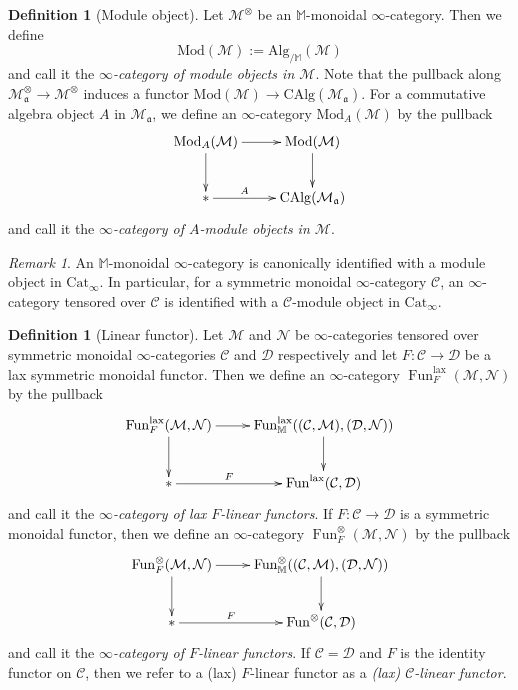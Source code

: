 \documentclass{amsart}
\theoremstyle{plain}
\theoremstyle{definition}
\newtheorem{definition}[theorem]{Definition}
\theoremstyle{remark}
\newtheorem{remark}[theorem]{Remark}
\numberwithin{equation}{theorem}
\newcommand{\mcal}[1]{\mathcal{#1}}
\newcommand{\mbb}[1]{\mathbb{#1}}
\newcommand{\mfk}[1]{\mathfrak{#1}}
\newcommand{\Alg}{\mathrm{Alg}}
\newcommand{\CAlg}{\mathrm{CAlg}}
\newcommand{\Cat}{\mathrm{Cat}}
\newcommand{\Mod}{\mathrm{Mod}}
\newcommand{\lax}{\mathrm{lax}}
\newcommand{\Fun}{\operatorname{Fun}}
\begin{document}
\begin{definition}[Module object]\label{def:Mod3}
Let $\mcal{M}^\otimes$ be an $\mbb{M}$-monoidal $\infty$-category.
Then we define
\[
	\Mod(\mcal{M}) := \Alg_{/\mbb{M}}(\mcal{M})
\]
and call it the \textit{$\infty$-category of module objects in $\mcal{M}$}.
Note that the pullback along $\mcal{M}^\otimes_\mfk{a}\to\mcal{M}^\otimes$ induces a functor $\Mod(\mcal{M})\to\CAlg(\mcal{M}_\mfk{a})$.
For a commutative algebra object $A$ in $\mcal{M}_\mfk{a}$, we define an $\infty$-category $\Mod_A(\mcal{M})$ by the pullback
\[
\xymatrix{
	\Mod_A(\mcal{M}) \ar[r] \ar[d] & \Mod(\mcal{M}) \ar[d] \\
	{*} \ar[r]^-A & \CAlg(\mcal{M}_\mfk{a})
}
\]
and call it the \textit{$\infty$-category of $A$-module objects in $\mcal{M}$}.
\end{definition}

\begin{remark}
An $\mbb{M}$-monoidal $\infty$-category is canonically identified with a module object in $\Cat_\infty$.
In particular, for a symmetric monoidal $\infty$-category $\mcal{C}$, an $\infty$-category tensored over $\mcal{C}$ is identified with a $\mcal{C}$-module object in $\Cat_\infty$.
\end{remark}

\begin{definition}[Linear functor]\label{def:Mod4}
Let $\mcal{M}$ and $\mcal{N}$ be $\infty$-categories tensored over symmetric monoidal $\infty$-categories $\mcal{C}$ and $\mcal{D}$ respectively and let $F\colon\mcal{C}\to\mcal{D}$ be a lax symmetric monoidal functor.
Then we define an $\infty$-category $\Fun_F^\lax(\mcal{M},\mcal{N})$ by the pullback
\[
\xymatrix{
	\Fun_F^\lax(\mcal{M},\mcal{N}) \ar[r] \ar[d] & \Fun_\mbb{M}^\lax((\mcal{C},\mcal{M}),(\mcal{D},\mcal{N})) \ar[d] \\
	{*} \ar[r]^-F & \Fun^\lax(\mcal{C},\mcal{D})
}
\]
and call it the \textit{$\infty$-category of lax $F$-linear functors}.
If $F\colon\mcal{C}\to\mcal{D}$ is a symmetric monoidal functor, then we define an $\infty$-category $\Fun_F^\otimes(\mcal{M},\mcal{N})$ by the pullback
\[
\xymatrix{
	\Fun_F^\otimes(\mcal{M},\mcal{N}) \ar[r] \ar[d] & \Fun_\mbb{M}^\otimes((\mcal{C},\mcal{M}),(\mcal{D},\mcal{N})) \ar[d] \\
	{*} \ar[r]^-F & \Fun^\otimes(\mcal{C},\mcal{D})
}
\]
and call it the \textit{$\infty$-category of $F$-linear functors}.
If $\mcal{C}=\mcal{D}$ and $F$ is the identity functor on $\mcal{C}$, then we refer to a (lax) $F$-linear functor as a \textit{(lax) $\mcal{C}$-linear functor}.
\end{definition}
\end{document}
